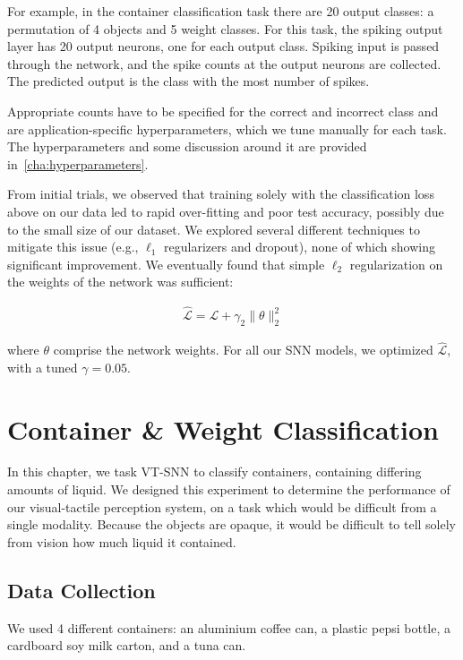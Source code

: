 \documentclass[fyp]{socreport}
\begin{document}
For example, in the container classification task there are 20 output classes: a
permutation of 4 objects and 5 weight classes. For this task, the spiking output
layer has 20 output neurons, one for each output class. Spiking input is passed
through the network, and the spike counts at the output neurons are collected.
The predicted output is the class with the most number of spikes.

Appropriate counts have to be specified for the correct and incorrect class and
are application-specific hyperparameters, which we tune manually for each task.
The hyperparameters and some discussion around it are provided
in~\autoref{cha:hyperparameters}.

From initial trials, we observed that training solely with the classification
loss above on our data led to rapid over-fitting and poor test accuracy,
possibly due to the small size of our dataset. We explored several different
techniques to mitigate this issue (e.g., $\ell_1$ regularizers and dropout),
none of which showing significant improvement. We eventually found that simple
$\ell_2$ regularization on the weights of the network was sufficient:

\begin{align}
    \mathcal{\hat{L}} = \mathcal{L} +  \gamma_2 \| \theta \|^2_2
\end{align}

where $\theta$ comprise the network weights. For all our SNN models, we
optimized $\mathcal{\hat{L}}$, with a tuned $\gamma = 0.05$.

\chapter{Container \& Weight Classification\label{cha:container_class}}

In this chapter, we task VT-SNN to classify containers, containing differing
amounts of liquid. We designed this experiment to determine the performance of
our visual-tactile perception system, on a task which would be difficult from a
single modality. Because the objects are opaque, it would be difficult to tell
solely from vision how much liquid it contained.

\section{Data Collection}
We used 4 different containers: an aluminium coffee can, a plastic pepsi bottle,
a cardboard soy milk carton, and a tuna can.
\end{document}
